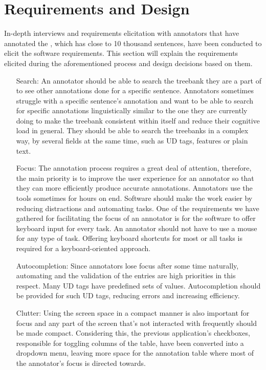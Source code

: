 \section{Requirements and Design}
\label{sec:requirements}

In-depth interviews and requirements elicitation with annotators that have annotated the \bountreebank{}, which has close to 10 thousand sentences, have been conducted to elicit the software requirements.
This section will explain the requirements elicited during the aforementioned process and design decisions based on them.

\begin{itemize}[before=\normalfont, font=\itshape, align=left]
\item[Search:]
An annotator should be able to search the treebank they are a part of to see other annotations done for a specific sentence.
Annotators sometimes struggle with a specific sentence's annotation and want to be able to search for specific annotations linguistically similar to the one they are currently doing to make the treebank consistent within itself and reduce their cognitive load in general.
They should be able to search the treebanks in a complex way, by several fields at the same time, such as UD tags, features or plain text.

\item[Focus:]
The annotation process requires a great deal of attention, therefore, the main priority is to improve the user experience for an annotator so that they can more efficiently produce accurate annotations.
Annotators use the tools sometimes for hours on end.
Software should make the work easier by reducing distractions and automating tasks.
One of the requirements we have gathered for facilitating the focus of an annotator is for the software to offer keyboard input for every task.
An annotator should not have to use a mouse for any type of task.
Offering keyboard shortcuts for most or all tasks is required for a keyboard-oriented approach.

\item[Autocompletion:]
Since annotators lose focus after some time naturally, automating and the validation of the entries are high priorities in this respect.
Many UD tags have predefined sets of values.
Autocompletion should be provided for such UD tags, reducing errors and increasing efficiency.

\item[Clutter:]
Using the screen space in a compact manner is also important for focus and any part of the screen that's not interacted with frequently should be made compact.
Considering this, the previous application's checkboxes, responsible for toggling columns of the table, have been converted into a dropdown menu, leaving more space for the annotation table where most of the annotator's focus is directed towards.


\end{itemize}
